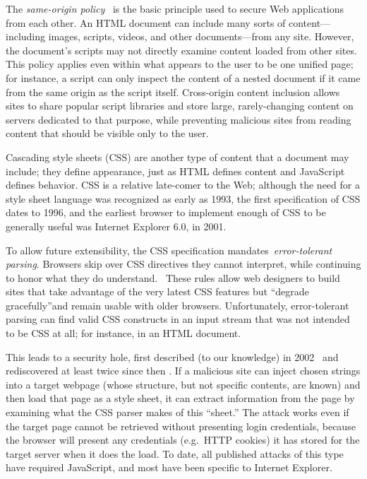 \documentclass{sig-alternate}
\begin{document}
The \emph{same-origin policy}~\cite{mozillasameorigin} is the basic
principle used to secure Web applications from each other. An HTML
document can include many sorts of content---including images,
scripts, videos, and other documents---from any site. However, the
document's scripts may not directly examine content loaded from other
sites. This policy applies even within what appears to the user to be
one unified page; for instance, a script can only inspect the content
of a nested document if it came from the same origin as the script
itself. Cross-origin content inclusion allows sites to share popular
script libraries and store large, rarely-changing content on servers
dedicated to that purpose, while preventing malicious sites from
reading content that should be visible only to the user.

Cascading style sheets (CSS) are another type of content that a
document may include; they define appearance, just as HTML defines
content and JavaScript defines behavior. CSS is a relative late-comer
to the Web; although the need for a style sheet language was
recognized as early as 1993, the first specification of CSS dates to
1996, and the earliest browser to implement enough of CSS to be
generally useful was Internet Explorer 6.0, in 2001.~\cite{css-hakon}

To allow future extensibility, the CSS specification
mandates~\emph{error-tolerant parsing}. Browsers skip over CSS
directives they cannot interpret, while continuing to honor what they
do understand.~\cite{syndata} These rules allow web designers to build
sites that take advantage of the very latest CSS features but ``degrade
gracefully''and remain usable with older browsers. Unfortunately,
error-tolerant parsing can find valid CSS constructs in an input
stream that was not intended to be CSS at all; for instance, in an
HTML document.

This leads to a security hole, first described (to our knowledge) in
2002~\cite{cssxss02} and rediscovered at least twice since then
\cite{cssxss05,cssxss08}.  If a malicious site can inject chosen
strings into a target webpage (whose structure, but not specific
contents, are known) and then load that page as a style sheet, it can
extract information from the page by examining what the CSS parser
makes of this ``sheet.'' The attack works even if the target page
cannot be retrieved without presenting login credentials, because the
browser will present any credentials (e.g.~HTTP cookies) it has stored
for the target server when it does the load.  To date, all published
attacks of this type have required JavaScript, and most have been
specific to Internet Explorer.
\end{document}
